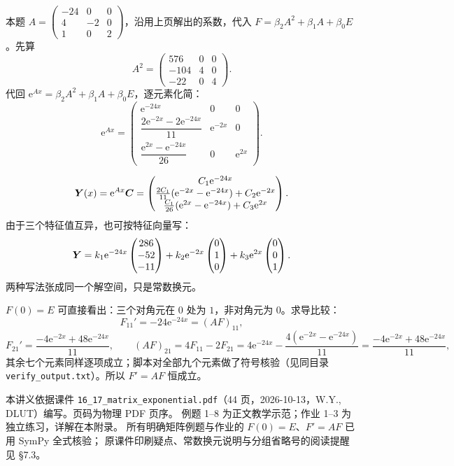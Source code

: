 \documentclass[11pt]{ctexart}
\newcommand{\mat}[1]{\begin{pmatrix}#1\end{pmatrix}}
\newcommand{\ee}{\mathrm{e}}
\begin{document}
本题 $A=\left(\begin{smallmatrix}-24&0&0\\4&-2&0\\1&0&2\end{smallmatrix}\right)$，沿用上页解出的系数，代入 $F=\beta_2A^2+\beta_1A+\beta_0E$。先算
\[
A^2=\mat{576&0&0\\-104&4&0\\-22&0&4}.
\]
代回 $\ee^{Ax}=\beta_2A^2+\beta_1A+\beta_0E$，逐元素化简：
\[
\ee^{Ax}=\mat{
\ee^{-24x}&0&0\\[3pt]
\dfrac{2\ee^{-2x}-2\ee^{-24x}}{11}&\ee^{-2x}&0\\[6pt]
\dfrac{\ee^{2x}-\ee^{-24x}}{26}&0&\ee^{2x}}.
\]

\[
\vect{Y}(x)=\ee^{Ax}\vect{C}
=\mat{
C_1\ee^{-24x}\\
\frac{2C_1}{11}(\ee^{-2x}-\ee^{-24x})+C_2\ee^{-2x}\\
\frac{C_1}{26}(\ee^{2x}-\ee^{-24x})+C_3\ee^{2x}}.
\]
由于三个特征值互异，也可按特征向量写：
\[
\vect{Y}=k_1\ee^{-24x}\mat{286\\-52\\-11}+k_2\ee^{-2x}\mat{0\\1\\0}+k_3\ee^{2x}\mat{0\\0\\1}.
\]
两种写法张成同一个解空间，只是常数换元。

$F(0)=E$ 可直接看出：三个对角元在 $0$ 处为 $1$，非对角元为 $0$。求导比较：
\[
F_{11}'=-24\ee^{-24x}=(AF)_{11},
\]
\[
F_{21}'=\frac{-4\ee^{-2x}+48\ee^{-24x}}{11},
\qquad
(AF)_{21}=4F_{11}-2F_{21}
=4\ee^{-24x}-\frac{4(\ee^{-2x}-\ee^{-24x})}{11}
=\frac{-4\ee^{-2x}+48\ee^{-24x}}{11},
\]
其余七个元素同样逐项成立；脚本对全部九个元素做了符号核验（见同目录 \texttt{verify\_output.txt}）。所以 $F'=AF$ 恒成立。

\label{ans:P3:end}
\flowerrule

{\small\color{inkgray}
本讲义依据课件 \texttt{16\_17\_matrix\_exponential.pdf}（44 页，2026-10-13，W.Y., DLUT）编写。页码为物理 PDF 页序。
例题 1--8 为正文教学示范；作业 1--3 为独立练习，详解在本附录。
所有明确矩阵例题与作业的 $F(0)=E$、$F'=AF$ 已用 SymPy 全式核验；
原课件印刷疑点、常数换元说明与分组省略号的阅读提醒见 §7.3。}
\end{document}
